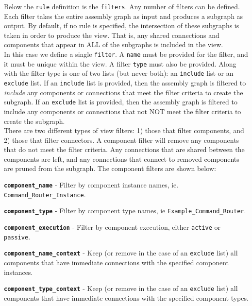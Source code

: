 Below the \texttt{rule} definition is the \texttt{filters}. Any number of filters can be defined. Each filter takes the entire assembly graph as input and produces a subgraph as output. By default, if no rule is specified, the intersection of these subgraphs is taken in order to produce the view. That is, any shared connections and components that appear in ALL of the subgraphs is included in the view. \\

In this case we define a single \texttt{filter}. A \texttt{name} must be provided for the filter, and it must be unique within the view. A filter \texttt{type} must also be provided. Along with the filter type is one of two lists (but never both): an \texttt{include} list or an \texttt{exclude} list. If an \texttt{include} list is provided, then the assembly graph is filtered to \textit{include} any components or connections that meet the filter criteria to create the subgraph. If an \texttt{exclude} list is provided, then the assembly graph is filtered to include any components or connections that not NOT meet the filter criteria to create the subgraph. \\

There are two different types of view filters: 1) those that filter components, and 2) those that filter connectors. A component filter will remove any components that do not meet the filter criteria. Any connections that are shared between the components are left, and any connections that connect to removed components are pruned from the subgraph. The component filters are shown below:

\vspace{5mm} %
\begin{spaceditemize}
  \item \textbf{\texttt{component\_name}} - Filter by component instance names, ie. \texttt{Command\_Router\_Instance}.
  \item \textbf{\texttt{component\_type}} - Filter by component type names, ie \texttt{Example\_Command\_Router}.
  \item \textbf{\texttt{component\_execution}} - Filter by component execution, either \texttt{active} or \texttt{passive}.
  \item \textbf{\texttt{component\_name\_context}} - Keep (or remove in the case of an \texttt{exclude} list) all components that have immediate connections with the specified component instances.
  \item \textbf{\texttt{component\_type\_context}} - Keep (or remove in the case of an \texttt{exclude} list) all components that have immediate connections with the specified component types.
\end{spaceditemize}
\vspace{5mm} %

